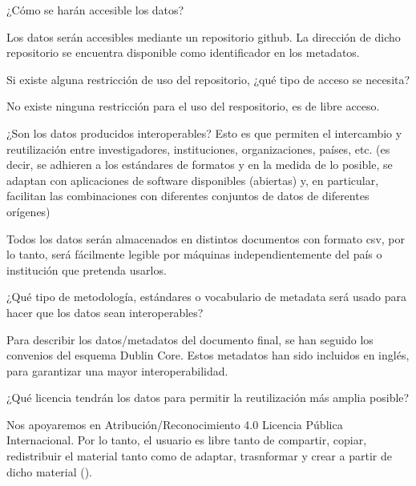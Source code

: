 \documentclass[12pt, spanish]{article}
\begin{document}
\begin{shaded}
¿Cómo se harán accesible los datos?
\end{shaded}
Los datos serán accesibles mediante un repositorio github. La dirección de dicho repositorio se encuentra disponible como identificador en los metadatos.\\

\begin{shaded}
Si existe alguna restricción de uso del repositorio, ¿qué tipo de acceso se necesita? 
\end{shaded}
No existe ninguna restricción para el uso del respositorio, es de libre acceso.\\


\begin{shaded}
¿Son los datos producidos interoperables? Esto es que permiten el intercambio y reutilización entre investigadores, instituciones, organizaciones, países, etc. (es decir, se adhieren a los estándares de formatos y en la medida de lo posible, se adaptan con aplicaciones de software disponibles (abiertas) y, en particular, facilitan las combinaciones con diferentes conjuntos de datos de diferentes orígenes)
\end{shaded}
Todos los datos serán almacenados en distintos documentos con formato csv, por lo tanto, será fácilmente legible por máquinas independientemente del país o institución que pretenda usarlos.\\


\begin{shaded}
¿Qué tipo de metodología, estándares o vocabulario de metadata será usado para hacer que los datos sean interoperables?
\end{shaded}
Para describir los datos/metadatos del documento final, se han seguido los convenios del esquema Dublin Core. Estos metadatos han sido incluidos en inglés, para garantizar una mayor interoperabilidad.\\



\begin{shaded}
¿Qué licencia tendrán los datos para permitir la reutilización más amplia posible?
\end{shaded}
Nos apoyaremos en Atribución/Reconocimiento 4.0 Licencia Pública Internacional. Por lo tanto, el usuario es libre tanto de compartir, copiar, redistribuir el material tanto como de adaptar, trasnformar y crear a partir de dicho material (\cite{CreativeCommonsCorporation2020}).\\
\end{document}
